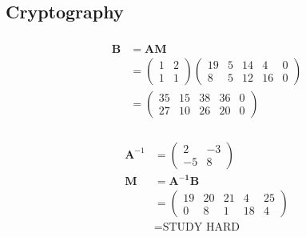 \documentclass{article}
\begin{document}
\subsection{Cryptography}

\subsubsection{}

\begin{align*}
  \mathbf{B} & = \mathbf{A M}                       \\
             & = \begin{pmatrix}
                   1 & 2 \\
                   1 & 1
                 \end{pmatrix} \begin{pmatrix}
                                 19 & 5 & 14 & 4  & 0 \\
                                 8  & 5 & 12 & 16 & 0
                               \end{pmatrix} \\
             & = \begin{pmatrix}
                   35 & 15 & 38 & 36 & 0 \\
                   27 & 10 & 26 & 20 & 0
                 \end{pmatrix}
\end{align*}

\setcounter{subsubsection}{6}
\subsubsection{}

\begin{align*}
  \mathbf{A}^{-1} & = \begin{pmatrix}
                        2  & -3 \\
                        -5 & 8
                      \end{pmatrix}         \\
  \mathbf{M}      & = \mathbf{A^{-1} B}      \\
                  & = \begin{pmatrix}
                        19 & 20 & 21 & 4  & 25 \\
                        0  & 8  & 1  & 18 & 4
                      \end{pmatrix} \\
                  & = \text{STUDY HARD}
\end{align*}
\end{document}

